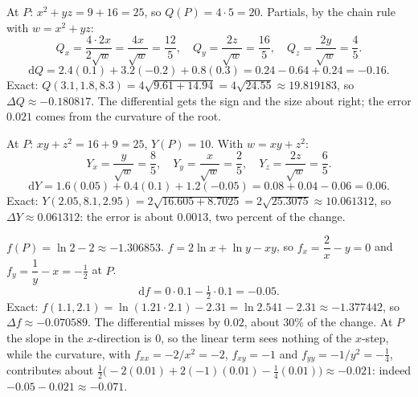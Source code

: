 \begin{solutions}
  \item At $P$: $x^{2}+yz=9+16=25$, so $Q(P)=4\cdot5=20$. Partials, by
        the chain rule with $w=x^{2}+yz$:
        \[
          Q_{x}=\frac{4\cdot2x}{2\sqrt w}=\frac{4x}{\sqrt w}=\frac{12}{5},\quad
          Q_{y}=\frac{2z}{\sqrt w}=\frac{16}{5},\quad
          Q_{z}=\frac{2y}{\sqrt w}=\frac45 .
        \]
        \[
          \mathrm{d}Q=2.4(0.1)+3.2(-0.2)+0.8(0.3)=0.24-0.64+0.24=-0.16 .
        \]
        Exact: $Q(3.1,1.8,8.3)=4\sqrt{9.61+14.94}=4\sqrt{24.55}
        \approx19.819183$, so $\Delta Q\approx-0.180817$. The differential
        gets the sign and the size about right; the error $0.021$ comes
        from the curvature of the root.
  \item At $P$: $xy+z^{2}=16+9=25$, $Y(P)=10$. With $w=xy+z^{2}$:
        \[
          Y_{x}=\frac{y}{\sqrt w}=\frac85,\quad Y_{y}=\frac{x}{\sqrt w}=\frac25,
          \quad Y_{z}=\frac{2z}{\sqrt w}=\frac65 .
        \]
        \[
          \mathrm{d}Y=1.6(0.05)+0.4(0.1)+1.2(-0.05)=0.08+0.04-0.06=0.06 .
        \]
        Exact: $Y(2.05,8.1,2.95)=2\sqrt{16.605+8.7025}=2\sqrt{25.3075}
        \approx10.061312$, so $\Delta Y\approx0.061312$: the error is about
        $0.0013$, two percent of the change.
  \item $f(P)=\ln2-2\approx-1.306853$. $f=2\ln x+\ln y-xy$, so
        $f_{x}=\dfrac2x-y=0$ and $f_{y}=\dfrac1y-x=-\tfrac12$ at $P$.
        \[
          \mathrm{d}f=0\cdot0.1-\tfrac12\cdot0.1=-0.05 .
        \]
        Exact: $f(1.1,2.1)=\ln(1.21\cdot2.1)-2.31=\ln2.541-2.31\approx
        -1.377442$, so $\Delta f\approx-0.070589$. The differential misses
        by $0.02$, about $30\%$ of the change. At $P$ the slope in the
        $x$-direction is $0$, so the linear term sees nothing of the
        $x$-step, while the curvature, with $f_{xx}=-2/x^{2}=-2$,
        $f_{xy}=-1$ and $f_{yy}=-1/y^{2}=-\tfrac14$, contributes about
        $\tfrac12\bigl(-2(0.01)+2(-1)(0.01)-\tfrac14(0.01)\bigr)\approx-0.021$:
        indeed $-0.05-0.021\approx-0.071$.
\end{solutions}
